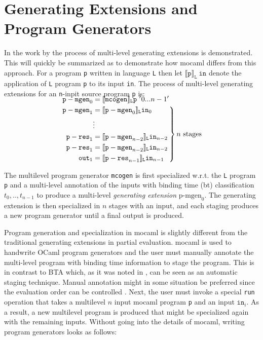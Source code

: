 
\section{Generating Extensions and Program Generators}

In the work by \cite{multilevel} the process of multi-level generating extensions is demonstrated. This will quickly be summarized as to demonstrate how mocaml differs from this approach. For a program \texttt{p} written in language \texttt{L} then let $\llbracket \mathtt{p}\rrbracket_\mathtt{L}~\mathtt{in}$ denote the application of \texttt{L} program \texttt{p} to its input \texttt{in}. The process of multi-level generating extensions for an \texttt{n}-inpit
source program \texttt{p} is:

\begin{align*}
  \left. 
  \begin{aligned}
    \noalign{\vspace{-\baselineskip}}
    \mathtt{p-mgen}_0 &= \llbracket \mathtt{mcogen}\rrbracket_\mathtt{L} \mathtt{p} ~ '0...n-1'\\  
    \mathtt{p-mgen}_1 &= \llbracket \mathtt{p-mgen}_0\rrbracket_\mathtt{L} \mathtt{in}_0\\
                      &\vdots\\
    \mathtt{p-res}_1 &= \llbracket \mathtt{p-mgen}_{n-2}\rrbracket_\mathtt{L} \mathtt{in}_{n-2}\\
    \mathtt{p-res}_1 &= \llbracket \mathtt{p-mgen}_{n-2}\rrbracket_\mathtt{L} \mathtt{in}_{n-2}\\
    \mathtt{out}_1 &= \llbracket \mathtt{p-res}_{n-1}\rrbracket_\mathtt{L} \mathtt{in}_{n-1}
  \end{aligned}
  \right\}n~\text{stages}                     
\end{align*}

The multilevel program generator \texttt{mcogen} is first specialized w.r.t. the \texttt{L} program \texttt{p} and a multi-level annotation of the inputs with binding time (bt) classification $t_0,..,t_{n-1}$ to produce a multi-level \textit{generating extension} $\text{p-mgen}_0$. The generating extension is then specialized in $n$ stages with an input, and each staging produces a new program generator until a final output is produced.

Program generation and specialization in mocaml is slightly different from the traditional generating extensions in partial evaluation. mocaml is used to handwrite OCaml program generators and the user must manually annotate the multi-level program with binding time information to stage the program. This is in contrast to BTA which, as it was noted in \cite{metaML}, can be seen as an automatic staging technique. Manual annotation might in some situation be preferred since the evaluation order can be controlled \cite{metaML}. Next, the user must invoke a special \texttt{run} operation that takes a multilevel $n$ input mocaml program \texttt{p} and an input $\mathtt{in}_i$. As a result, a new multilevel program is produced that might be specialized again with the remaining inputs. Without going into the details of mocaml, writing program generators looks as follows:

